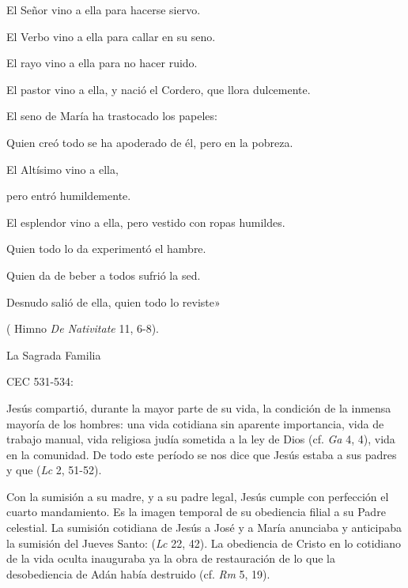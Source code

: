 	\begin{patercite}
		El Señor vino a ella para hacerse siervo.
	
		El Verbo vino a ella para callar en su seno.
		
		El rayo vino a ella para no hacer ruido.
		
		El pastor vino a ella, y nació el Cordero, que llora dulcemente.
		
		El seno de María ha trastocado los papeles:
		
		Quien creó todo se ha apoderado de él, pero en la pobreza.
		
		El Altísimo vino a ella,
		
		pero entró humildemente.
		
		El esplendor vino a ella, pero vestido con ropas humildes.
		
		Quien todo lo da experimentó el hambre.
		
		Quien da de beber a todos sufrió la sed.
		
		Desnudo salió de ella, quien todo lo reviste»
		
		( Himno \emph{De Nativitate} 11, 6-8).				
	\end{patercite}	

		

	
	
	La Sagrada Familia
	
	CEC 531-534:
	
	
	 Jesús compartió, durante la mayor parte de su vida, la condición de la inmensa mayoría de los hombres: una vida cotidiana sin aparente importancia, vida de trabajo manual, vida religiosa judía sometida a la ley de Dios (cf. \emph{Ga} 4, 4), vida en la comunidad. De todo este período se nos dice que Jesús estaba  a sus padres y que  (\emph{Lc} 2, 51-52).
	
	 Con la sumisión a su madre, y a su padre legal, Jesús cumple con perfección el cuarto mandamiento. Es la imagen temporal de su obediencia filial a su Padre celestial. La sumisión cotidiana de Jesús a José y a María anunciaba y anticipaba la sumisión del Jueves Santo:  (\emph{Lc} 22, 42). La obediencia de Cristo en lo cotidiano de la vida oculta inauguraba ya la obra de restauración de lo que la desobediencia de Adán había destruido (cf. \emph{Rm} 5, 19).
	
